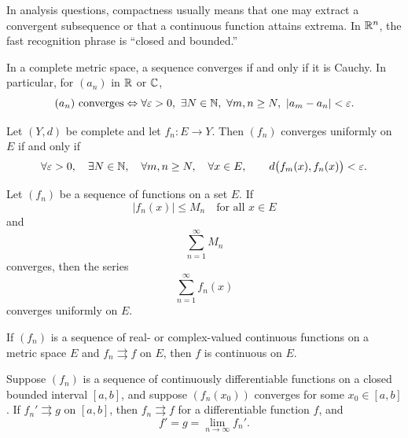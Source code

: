    \begin{strategy}
        In analysis questions, compactness usually means that one may extract a
        convergent subsequence or that a continuous function attains extrema.
        In $\mathbb{R}^n$, the fast recognition phrase is ``closed and bounded.''
    \end{strategy}

    \begin{theorem}
        In a complete metric space, a sequence converges if and only if it is
        Cauchy. In particular, for $(a_n)$ in $\mathbb{R}$ or $\mathbb{C}$,
        \[
            (a_n)\text{ converges}
            \Leftrightarrow
            \forall\varepsilon>0,
            \ \exists N\in\mathbb{N},
            \ \forall m,n\geq N,
            \ |a_m-a_n|<\varepsilon.
        \]
    \end{theorem}

    \begin{theorem}
        Let $(Y,d)$ be complete and let $f_n:E\to Y$. Then $(f_n)$ converges
        uniformly on $E$ if and only if
        \[
            \forall\varepsilon>0,
            \quad
            \exists N\in\mathbb{N},
            \quad
            \forall m,n\geq N,
            \quad
            \forall x\in E,
            \qquad
            d\bigl(f_m(x),f_n(x)\bigr)<\varepsilon.
        \]
    \end{theorem}

    \begin{theorem}
        Let $(f_n)$ be a sequence of functions on a set $E$. If
        \[
            |f_n(x)|\leq M_n
            \quad\text{for all }x\in E
        \]
        and
        \[
            \sum_{n=1}^{\infty}M_n
        \]
        converges, then the series
        \[
            \sum_{n=1}^{\infty} f_n(x)
        \]
        converges uniformly on $E$.
    \end{theorem}

    \begin{theorem}
        If $(f_n)$ is a sequence of real- or complex-valued continuous functions
        on a metric space $E$ and $f_n\rightrightarrows f$ on $E$, then $f$ is continuous
        on $E$.
    \end{theorem}

    \begin{theorem}
        Suppose $(f_n)$ is a sequence of continuously differentiable functions
        on a closed bounded interval $[a,b]$, and suppose $(f_n(x_0))$
        converges for some $x_0\in[a,b]$. If $f_n'\rightrightarrows g$ on
        $[a,b]$, then $f_n\rightrightarrows f$ for a differentiable function
        $f$, and
        \[
            f'=g=\lim\limits_{n\to\infty} f_n'.
        \]
    \end{theorem}

